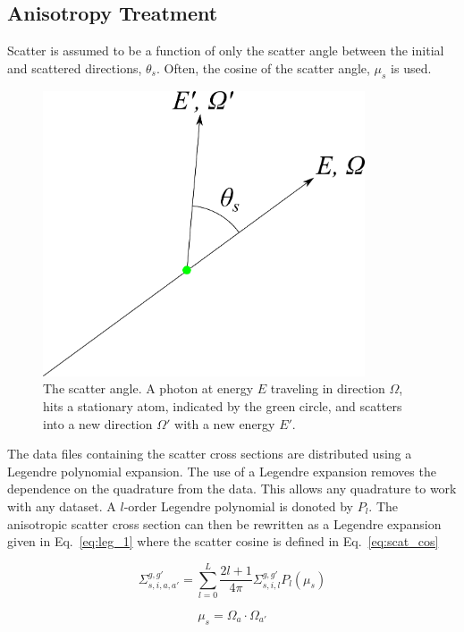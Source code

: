 \subsection{Anisotropy Treatment}

Scatter is assumed to be a function of only the scatter angle between the initial and scattered directions, $\theta_s$. Often, the cosine of the scatter angle, $\mu_s$ is used.

\begin{figure}[tb]
  \begin{center}
   \includegraphics[width=3.75in]{figs/scat_ang}
  \end{center}
  \caption{The scatter angle. A photon at energy $E$ traveling in direction $\Omega$, hits a stationary atom, indicated by the green circle, and scatters into a new direction $\Omega'$ with a new energy $E'$.}
\label{fig:scat_ang}
\end{figure}%

The data files containing the scatter cross sections are distributed using a Legendre polynomial expansion. The use of a Legendre expansion removes the dependence on the quadrature from the data. This allows any quadrature to work with any dataset. A $l$-order Legendre polynomial is donoted by $P_l$. The anisotropic scatter cross section can then be rewritten as a Legendre expansion given in Eq.~\ref{eq:leg_1} where the scatter cosine is defined in Eq.~\ref{eq:scat_cos}

\begin{equation} \label{eq:leg_1}
\Sigma_{s, i, a, a'}^{g, g'} = \sum_{l=0}^L \frac{2l+1}{4 \pi}\Sigma_{s, i, l}^{g, g'} P_l(\mu_s)
\end{equation}

\begin{equation} \label{eq:scat_cos}
\mu_s = \Omega_a \cdot \Omega_{a'}
\end{equation}

